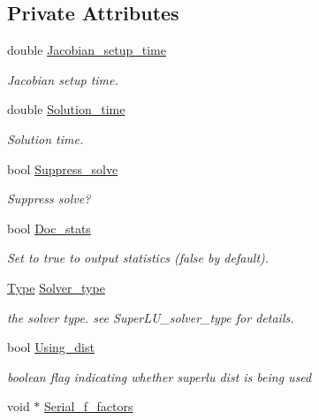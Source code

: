 \subsection*{Private Attributes}
\begin{DoxyCompactItemize}
\item 
double \hyperlink{classoomph_1_1SuperLUSolver_ac712018d9ba5b50a1e6777e55303b5b8}{Jacobian\+\_\+setup\+\_\+time}
\begin{DoxyCompactList}\small\item\em Jacobian setup time. \end{DoxyCompactList}\item 
double \hyperlink{classoomph_1_1SuperLUSolver_a45c813ff80cad04e58efebe9bb1bfecb}{Solution\+\_\+time}
\begin{DoxyCompactList}\small\item\em Solution time. \end{DoxyCompactList}\item 
bool \hyperlink{classoomph_1_1SuperLUSolver_a88f9065710fb4b6096369586be76a67c}{Suppress\+\_\+solve}
\begin{DoxyCompactList}\small\item\em Suppress solve? \end{DoxyCompactList}\item 
bool \hyperlink{classoomph_1_1SuperLUSolver_a052def009be940b82847d6c476fd0319}{Doc\+\_\+stats}
\begin{DoxyCompactList}\small\item\em Set to true to output statistics (false by default). \end{DoxyCompactList}\item 
\hyperlink{classoomph_1_1SuperLUSolver_a55d3709b5e082ecce2b41f9db6716e1a}{Type} \hyperlink{classoomph_1_1SuperLUSolver_a26ba07c6f63b830e73c594debe9e68a9}{Solver\+\_\+type}
\begin{DoxyCompactList}\small\item\em the solver type. see Super\+L\+U\+\_\+solver\+\_\+type for details. \end{DoxyCompactList}\item 
bool \hyperlink{classoomph_1_1SuperLUSolver_a7420188d74f95b5b1543268ff3ccc9e0}{Using\+\_\+dist}
\begin{DoxyCompactList}\small\item\em boolean flag indicating whether superlu dist is being used \end{DoxyCompactList}\item 
void $\ast$ \hyperlink{classoomph_1_1SuperLUSolver_a7dc6fcd6c30c90fd66b7ea828075a718}{Serial\+\_\+f\+\_\+factors}

\end{DoxyCompactItemize}
